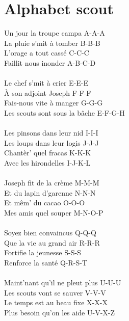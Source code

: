 
\section*{Alphabet scout}
Un jour la troupe campa A-A-A\\
La pluie s'mit à tomber B-B-B\\
L'orage a tout cassé C-C-C\\
Faillit nous inonder A-B-C-D\\
\\
Le chef s'mit à crier E-E-E\\
À son adjoint Joseph F-F-F\\
Fais-nous vite à manger G-G-G\\
Les scouts sont sous la bâche E-F-G-H\\
\\
Les pinsons dans leur nid I-I-I\\
Les loups dans leur logis J-J-J\\
Chantèr' quel fracas K-K-K\\
Avec les hirondelles I-J-K-L\\
\\
Joseph fit de la crème M-M-M\\
Et du lapin d'garenne N-N-N\\
Et mêm' du cacao O-O-O\\
Mes amis quel souper M-N-O-P\\
\\
Soyez bien convaincus Q-Q-Q\\
Que la vie au grand air R-R-R\\
Fortifie la jeunesse S-S-S\\
Renforce la santé Q-R-S-T\\
\\
Maint'nant qu'il ne pleut plus U-U-U \\
Les scouts vont se sauver V-V-V\\
Le temps est au beau fixe X-X-X\\
Plus besoin qu'on les aide U-V-X-Z\\